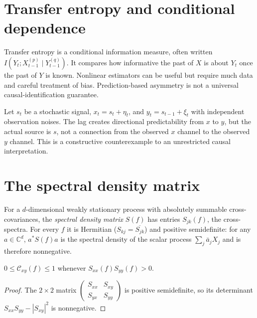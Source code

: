 \section{Transfer entropy and conditional dependence}
Transfer entropy is a conditional information measure, often written $I(Y_t;X_{t-1}^{(p)}\mid Y_{t-1}^{(q)})$. It compares how informative the past of $X$ is about $Y_t$ once the past of $Y$ is known. Nonlinear estimators can be useful but require much data and careful treatment of bias. Prediction-based asymmetry is not a universal causal-identification guarantee.

\begin{workedexample}
Let $s_t$ be a stochastic signal, $x_t=s_t+\eta_t$, and $y_t=s_{t-1}+\xi_t$ with independent observation noises. The lag creates directional predictability from $x$ to $y$, but the actual source is $s$, not a connection from the observed $x$ channel to the observed $y$ channel. This is a constructive counterexample to an unrestricted causal interpretation.
\end{workedexample}
\section{The spectral density matrix}
For a $d$-dimensional weakly stationary process with absolutely summable cross-covariances, the \emph{spectral density matrix} $S(f)$ has entries $S_{jk}(f)$, the cross-spectra. For every $f$ it is Hermitian ($S_{kj}=\overline{S_{jk}}$) and positive semidefinite: for any $a\in\mathbb C^d$, $a^\ast S(f)a$ is the spectral density of the scalar process $\sum_j\bar a_jX_j$ and is therefore nonnegative.

\begin{proposition}
$0\le\mathcal C_{xy}(f)\le1$ whenever $S_{xx}(f)S_{yy}(f)>0$.
\end{proposition}
\begin{proof}
The $2\times2$ matrix $\begin{pmatrix}S_{xx}&S_{xy}\\S_{yx}&S_{yy}\end{pmatrix}$ is positive semidefinite, so its determinant $S_{xx}S_{yy}-|S_{xy}|^2$ is nonnegative.
\end{proof}

